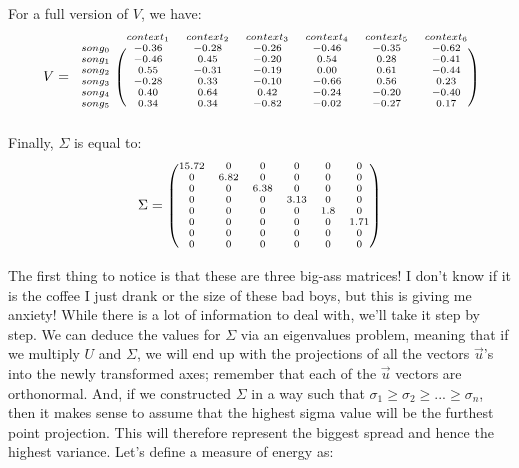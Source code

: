\documentclass[600paper, 11pt,twoside,openany]{kdp}
\begin{document}
\indent For a full version of $V$, we have:
\[
\scriptsize{
V = 
 \begin{blockarray}{ccccccc}
& context_1 & context_2 & context_3 & context_4 & context_5& context_6\\
\begin{block}{c(cccccc)}
song_0 & -0.36 & -0.28 & -0.26 & -0.46 & -0.35 & -0.62 \\
song_1 & -0.46 &  0.45 & -0.20 &  0.54 &  0.28 & -0.41 \\
song_2 &  0.55 & -0.31 & -0.19 &  0.00 &  0.61 & -0.44 \\
song_3 & -0.28 &  0.33 & -0.10 & -0.66 &  0.56 &  0.23 \\
song_4 &  0.40 &  0.64 &  0.42 & -0.24 & -0.20 & -0.40 \\
song_5 &  0.34 &  0.34 & -0.82 & -0.02 & -0.27 &  0.17\\
\end{block}
\end{blockarray}
}
\]
Finally, $\Sigma$ is equal to:
\[
\scriptsize{
\Sigma = 
\begin{pmatrix}
15.72 & 0 & 0 & 0 & 0 & 0 \\
0 & 6.82 & 0 & 0 & 0 & 0 \\
0 & 0 & 6.38 & 0 & 0 & 0 \\
0 & 0 & 0 & 3.13 & 0 & 0 \\
0 & 0 & 0 & 0 & 1.8 & 0 \\
0 & 0 & 0 & 0 & 0 & 1.71 \\
0 & 0 & 0 & 0 & 0 & 0 \\
0 & 0 & 0 & 0 & 0 & 0 \\
\end{pmatrix}
}
\]
\par 
\vspace{-3pt}
\indent The first thing to notice is that these are three big-ass matrices! I don’t know if it is the coffee I just drank or the size of these bad boys, but this is giving me anxiety! While there is a lot of information to deal with, we’ll take it step by step. We can deduce the values for $\Sigma$ via an eigenvalues problem, meaning that if we multiply $U$ and $\Sigma$, we will end up with the projections of all the vectors $\overrightarrow{u}$’s  into the newly transformed axes; remember that each of the $\overrightarrow{u}$ vectors are orthonormal. And, if we constructed $\Sigma$ in a way such that $\sigma_1 \geq \sigma_2 \geq ...  \geq \sigma_n$, then it makes sense to assume that the highest sigma value will be the furthest point projection. This will therefore represent the biggest spread and hence the highest variance. Let’s define a measure of energy as:
\end{document}

